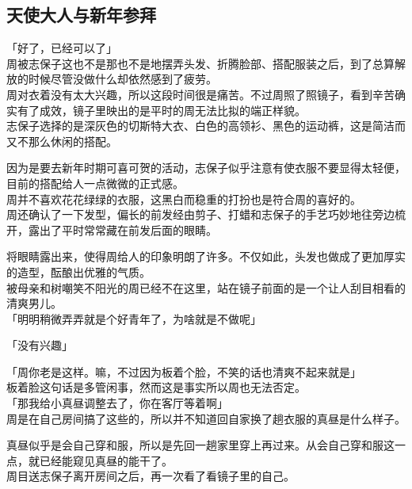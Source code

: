 \subsection{天使大人与新年参拜}

「好了，已经可以了」\\

周被志保子这也不是那也不是地摆弄头发、折腾脸部、搭配服装之后，到了总算解放的时候尽管没做什么却依然感到了疲劳。\\

周对衣着没有太大兴趣，所以这段时间很是痛苦。不过周照了照镜子，看到辛苦确实有了成效，镜子里映出的是平时的周无法比拟的端正样貌。\\

志保子选择的是深灰色的切斯特大衣、白色的高领衫、黑色的运动裤，这是简洁而又不那么休闲的搭配。

因为是要去新年时期可喜可贺的活动，志保子似乎注意有使衣服不要显得太轻便，目前的搭配给人一点微微的正式感。\\

周并不喜欢花花绿绿的衣服，这黑白而稳重的打扮也是符合周的喜好的。\\

周还确认了一下发型，偏长的前发经由剪子、打蜡和志保子的手艺巧妙地往旁边梳开，露出了平时常常藏在前发后面的眼睛。

将眼睛露出来，使得周给人的印象明朗了许多。不仅如此，头发也做成了更加厚实的造型，酝酿出优雅的气质。\\

被母亲和树嘲笑不阳光的周已经不在这里，站在镜子前面的是一个让人刮目相看的清爽男儿。\\

「明明稍微弄弄就是个好青年了，为啥就是不做呢」

「没有兴趣」

「周你老是这样。嘛，不过因为板着个脸，不笑的话也清爽不起来就是」\\

板着脸这句话是多管闲事，然而这是事实所以周也无法否定。\\

「那我给小真昼调整去了，你在客厅等着啊」\\

周是在自己房间搞了这些的，所以并不知道回自家换了趟衣服的真昼是什么样子。

真昼似乎是会自己穿和服，所以是先回一趟家里穿上再过来。从会自己穿和服这一点，就已经能窥见真昼的能干了。\\

周目送志保子离开房间之后，再一次看了看镜子里的自己。\\

